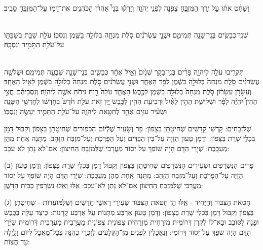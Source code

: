 \documentclass[twoside, openany, parskip=half, 11pt]{book}
\begin{document}
\\
 וְשָׁחַ֨ט   אֹת֜וֹ עַ֣ל יֶ֧רֶךְ הַמִּזְבֵּ֛חַ צָפֹ֖נָה לִפְנֵ֣י יְהֹוָ֑ה וְזָרְק֡וּ בְּנֵי֩ אַהֲרֹ֨ן הַכֹּהֲנִ֧ים אֶת־דָּמ֛וֹ עַל־הַמִּזְבֵּ֖חַ סָבִֽיב׃
 
\shabbos\\
 שְׁנֵֽי־כְבָשִׂ֥ים בְּנֵֽי־שָׁנָ֖ה תְּמִימִ֑ם וּשְׁנֵ֣י עֶשְׂרֹנִ֗ים סֹ֧לֶת מִנְחָ֛ה בְּלוּלָ֥ה בַשֶּׁ֖מֶן וְנִסְכּֽוֹ׃
עֹלַ֥ת שַׁבַּ֖ת בְּשַׁבַּתּ֑וֹ עַל־עֹלַ֥ת הַתָּמִ֖יד וְנִסְכָּֽהּ׃ 
 
 
\\
תַּקְרִ֥יבוּ עֹלָ֖ה לַיהֹוָ֑ה פָּרִ֨ים בְּנֵֽי־בָקָ֤ר שְׁנַ֙יִם֙ וְאַ֣יִל אֶחָ֔ד כְּבָשִׂ֧ים בְּנֵי־שָׁנָ֛ה שִׁבְעָ֖ה תְּמִימִֽם׃
 וּשְׁלֹשָׁ֣ה עֶשְׂרֹנִ֗ים סֹ֤לֶת מִנְחָה֙ בְּלוּלָ֣ה בַשֶּׁ֔מֶן לַפָּ֖ר הָאֶחָ֑ד וּשְׁנֵ֣י עֶשְׂרֹנִ֗ים סֹ֤לֶת מִנְחָה֙ בְּלוּלָ֣ה בַשֶּׁ֔מֶן לָאַ֖יִל הָֽאֶחָֽד׃
 וְעִשָּׂרֹ֣ן עִשָּׂר֗וֹן סֹ֤לֶת מִנְחָה֙ בְּלוּלָ֣ה בַשֶּׁ֔מֶן לַכֶּ֖בֶשׂ הָאֶחָ֑ד עֹלָה֙ רֵ֣יחַ נִיחֹ֔חַ אִשֶּׁ֖ה לַיהֹוָֽה׃
 וְנִסְכֵּיהֶ֗ם חֲצִ֣י הַהִין֩ יִהְיֶ֨ה לַפָּ֜ר וּשְׁלִישִׁ֧ת הַהִ֣ין לָאַ֗יִל וּרְבִיעִ֥ת הַהִ֛ין לַכֶּ֖בֶשׂ יָ֑יִן זֹ֣את עֹלַ֥ת חֹ֙דֶשׁ֙ בְּחׇדְשׁ֔וֹ לְחׇדְשֵׁ֖י הַשָּׁנָֽה׃
 וּשְׂעִ֨יר עִזִּ֥ים אֶחָ֛ד לְחַטָּ֖את לַיהֹוָ֑ה עַל־עֹלַ֧ת הַתָּמִ֛יד יֵעָשֶׂ֖ה וְנִסְכּֽוֹ׃ 



%
שֶׁלִּזְבָחִים: קׇדְשֵׁי קׇדָשִׁים שְׁחִיטָתָן בַּצָּפוֹן: פָּר וְשָׂעִיר שֶׁלְּֿיוֹם הַכִּפּוּרִים שְׁחִיטָתָן בַּצָּפוֹן וְקִבּוּל דָּמָן בִּכְלֵי שָׁרֵת בַּצָּפוֹן: וְדָמָן טָעוּן הַזָּיָה עַל־בֵּין הַבַּדִּים וְעַל הַפָּרֹֽכֶת וְעַל־מִזְבַּח הַזָּהָב: מַתָּנָה אַֽחַת מֵהֶן מְעַכָּֽבֶת: שְׁיָרֵי הַדָּם הָיָה שׁוֹפֵךְ עַל יְסוֹד מַעֲרָבִי שֶׁלַּמִּזְבֵּחַ הַחִיצוֹן: אִם־לֹא נָתַן לֹא עִכֵּב:

(ב) פָּרִים הַנִּשְׂרָפִים וּשְׂעִירִים הַנִּשְׂרָפִים שְׁחִיטָתָן בַּצָּפוֹן וְקִבּוּל דָּמָן בִּכְלִי שָׁרֵת בַּצָּפוֹן: וְדָמָן טָעוּן הַזָּיָה עַל־הַפָּרֹֽכֶת וְעַל־מִזְבַּח הַזָּהָב: מַתָּנָה אַֽחַת מֵהֶן מְעַכָּֽבֶת: שִׁיְֿרֵי הַדָּם הָיָה שׁוֹפֵךְ עַל יְסוֹד מַעֲרָבִי שֶׁלַּמִּזְבֵּחַ הַחִיצוֹן אִם־לֹא נָתַן לֹא־עִכֵּב: אֵֽלּוּ וָאֵֽלּוּ נִשְׂרָפִין בְּבֵית הַדָּשֶׁן: 
 
(ג) חַטֹּאת הַצִּבּוּר וְהַיָּחִיד - אֵֽלּוּ הֵן חַטֹּאת הַצִּבּוּר שְׂעִירֵי רָאשֵׁי חֳדָשִׁים וְשֶׁלַּמּוׁעֲדוׂת - שְׁחִיטָתָן בַּצָּפוֹן וְקִבּוּל דָּמָן בִּכְלִי שָׁרֵת בַּצָּפוֹן: וְדָמָן טָעוּן אַרְבַּע מַתָּנוֹת עַל אַרְבַּע קְרָנוֹת: כֵּיצַד עָלָה בַכֶּֽבֶשׁ וּפָנָה לַסּוֹבֵב וּבָא־לוֹ לְקֶֽרֶן דְּרוֹמִית מִזְרָחִית מִזְרָחִית צְפוֹנִית צְפוֹנִית מַעֲרָבִית מַעֲרָבִית דְּֿרוֹמִית שִׁיְּֿרֵי הַדָּם הָיָה שֹׁפֵךְ עַל יְסוֹד דְּרוֹמִי: וְנֶאֱכָלִין לִפְנִים מִן־הַקְּֿלָעִים לְזִכְרֵי כְהֻנָּה בְּכָל־מַאֲכָל לְיוֹם וָלַֽיְלָה עַד חֲצוֹת:
\end{document}
